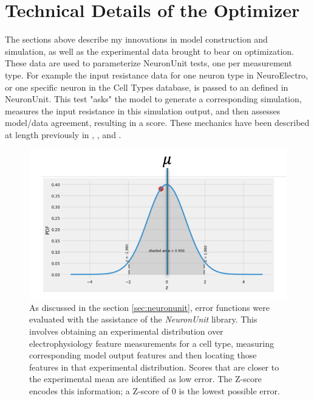 \section{Technical Details of the Optimizer}
The sections above describe my innovations in model construction and simulation, as well as the experimental data brought to bear on optimization. These data are used to parameterize NeuronUnit tests, one per measurement type.
For example the input resistance data for one neuron type in NeuroElectro, or one specific neuron in the Cell Types database, is passed to an  defined in NeuronUnit.
This test "asks" the model to generate a corresponding simulation, measures the input resistance in this simulation output, and then assesses model/data agreement, resulting in a score.
These mechanics have been described at length previously in \cite{omar2014collaborative}, \cite{gerkin_neuronunit}, and \cite{birgiolas2019towards}.

\begin{figure}
\begin{center}
	\includegraphics{figures/normal_distribution}
    \caption[Z-scores for NeuronUnit Tests]{As discussed in the section \ref{sec:neuronunit}, error functions were evaluated with the assistance of the \emph{NeuronUnit} library.
    This involves obtaining an experimental distribution over electrophysiology feature measurements for a cell type, measuring corresponding model output features and then locating those features in that experimental distribution. 
    Scores that are closer to the experimental mean are identified as low error.
	The Z-score encodes this information; a Z-score of 0 is the lowest possible error.}
\end{center}
	
\end{figure}

